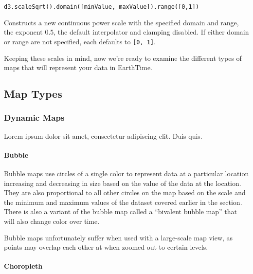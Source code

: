 \documentclass[
  12pt,
]{krantz}
\begin{document}
\texttt{d3.scaleSqrt().domain({[}minValue,\ maxValue{]}).range({[}0,1{]})}

Constructs a new continuous power scale with the specified domain and range, the exponent 0.5, the default interpolator and clamping disabled. If either domain or range are not specified, each defaults to \texttt{{[}0,\ 1{]}}.

Keeping these scales in mind, now we're ready to examine the different types of maps that will represent your data in EarthTime.

\hypertarget{map-types}{%
\subsection{Map Types}\label{map-types}}

\hypertarget{dynamic-maps}{%
\subsubsection*{Dynamic Maps}\label{dynamic-maps}}


Lorem ipsum dolor sit amet, consectetur adipiscing elit. Duis quis.

\hypertarget{bubble}{%
\paragraph*{Bubble}\label{bubble}}

Bubble maps use circles of a single color to represent data at a particular location increasing and decreasing in size based on the value of the data at the location. They are also proportional to all other circles on the map based on the scale and the minimum and maximum values of the dataset covered earlier in the section. There is also a variant of the bubble map called a ``bivalent bubble map'' that will also change color over time.

Bubble maps unfortunately suffer when used with a large-scale map view, as points may overlap each other at when zoomed out to certain levels.

\hypertarget{choropleth}{%
\paragraph*{Choropleth}\label{choropleth}}
\end{document}
